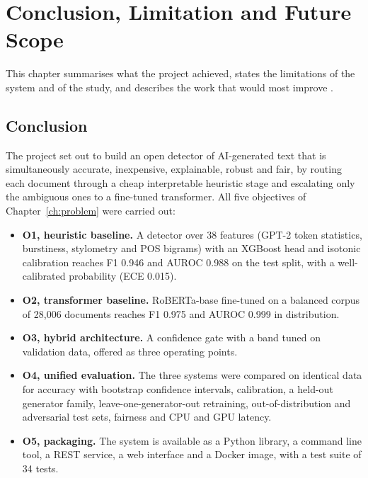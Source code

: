 \chapter{Conclusion, Limitation and Future Scope}
\label{ch:conclusion}

This chapter summarises what the project achieved, states the limitations of
the system and of the study, and describes the work that would most improve
\veriscript{}.

\section{Conclusion}

The project set out to build an open detector of AI-generated text that is
simultaneously accurate, inexpensive, explainable, robust and fair, by routing
each document through a cheap interpretable heuristic stage and escalating
only the ambiguous ones to a fine-tuned transformer. All five objectives of
Chapter~\ref{ch:problem} were carried out:
\begin{itemize}
  \item \textbf{O1, heuristic baseline.} A detector over 38 features (GPT-2
        token statistics, burstiness, stylometry and POS bigrams) with an
        XGBoost head and isotonic calibration reaches F1 0.946 and AUROC 0.988
        on the test split, with a well-calibrated probability (ECE 0.015).
  \item \textbf{O2, transformer baseline.} RoBERTa-base fine-tuned on a
        balanced corpus of 28,006 documents reaches F1 0.975 and AUROC 0.999
        in distribution.
  \item \textbf{O3, hybrid architecture.} A confidence gate with a band tuned
        on validation data, offered as three operating points.
  \item \textbf{O4, unified evaluation.} The three systems were compared on
        identical data for accuracy with bootstrap confidence intervals,
        calibration, a held-out generator family, leave-one-generator-out
        retraining, out-of-distribution and adversarial test sets, fairness
        and CPU and GPU latency.
  \item \textbf{O5, packaging.} The system is available as a Python library, a
        command line tool, a REST service, a web interface and a Docker image,
        with a test suite of 34 tests.
\end{itemize}


